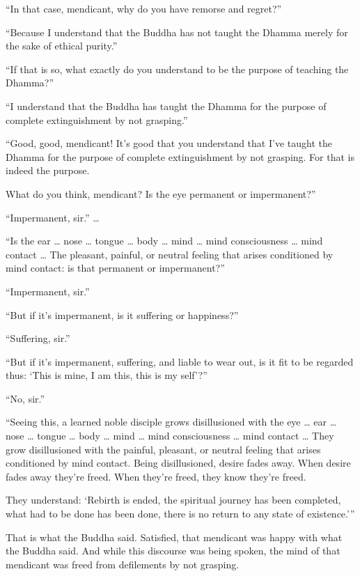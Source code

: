 \documentclass[12pt,openany]{book}%
\begin{document}
“In that case, mendicant, why do you have remorse and regret?” 

“Because I understand that the Buddha has not taught the Dhamma merely for the sake of ethical purity.” 

“If that is so, what exactly do you understand to be the purpose of teaching the Dhamma?” 

“I understand that the Buddha has taught the Dhamma for the purpose of complete extinguishment by not grasping.” 

“Good, good, mendicant! It’s good that you understand that I’ve taught the Dhamma for the purpose of complete extinguishment by not grasping. For that is indeed the purpose. 

What do you think, mendicant? Is the eye permanent or impermanent?” 

“Impermanent, sir.” … 

“Is the ear … nose … tongue … body … mind … mind consciousness … mind contact … The pleasant, painful, or neutral feeling that arises conditioned by mind contact: is that permanent or impermanent?” 

“Impermanent, sir.” 

“But if it’s impermanent, is it suffering or happiness?” 

“Suffering, sir.” 

“But if it’s impermanent, suffering, and liable to wear out, is it fit to be regarded thus: ‘This is mine, I am this, this is my self’?” 

“No, sir.” 

“Seeing this, a learned noble disciple grows disillusioned with the eye … ear … nose … tongue … body … mind … mind consciousness … mind contact … They grow disillusioned with the painful, pleasant, or neutral feeling that arises conditioned by mind contact. Being disillusioned, desire fades away. When desire fades away they’re freed. When they’re freed, they know they’re freed. 

They understand: ‘Rebirth is ended, the spiritual journey has been completed, what had to be done has been done, there is no return to any state of existence.’” 

That is what the Buddha said. Satisfied, that mendicant was happy with what the Buddha said. And while this discourse was being spoken, the mind of that mendicant was freed from defilements by not grasping. 
\end{document}
